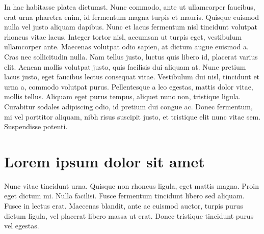 In hac habitasse platea dictumst. Nunc commodo, ante ut ullamcorper faucibus, erat urna pharetra enim, id fermentum magna turpis et mauris. Quisque euismod nulla vel justo aliquam dapibus. Nunc et lacus fermentum nisl tincidunt volutpat rhoncus vitae lacus. Integer tortor nisl, accumsan ut turpis eget, vestibulum ullamcorper ante. Maecenas volutpat odio sapien, at dictum augue euismod a. Cras nec sollicitudin nulla. Nam tellus justo, luctus quis libero id, placerat varius elit. Aenean mollis volutpat justo, quis facilisis dui aliquam at. Nunc pretium lacus justo, eget faucibus lectus consequat vitae. Vestibulum dui nisl, tincidunt et urna a, commodo volutpat purus. Pellentesque a leo egestas, mattis dolor vitae, mollis tellus. Aliquam eget purus tempus, aliquet nunc non, tristique ligula. Curabitur sodales adipiscing odio, id pretium dui congue ac. Donec fermentum, mi vel porttitor aliquam, nibh risus suscipit justo, et tristique elit nunc vitae sem. Suspendisse potenti.

\section{Lorem ipsum dolor sit amet}\label{sec:LABEL_CHP_1_SEC_J}
Nunc vitae tincidunt urna. Quisque non rhoncus ligula, eget mattis magna. Proin eget dictum mi. Nulla facilisi. Fusce fermentum tincidunt libero sed aliquam. Fusce in lectus erat. Maecenas blandit, ante ac euismod auctor, turpis purus dictum ligula, vel placerat libero massa ut erat. Donec tristique tincidunt purus vel egestas.